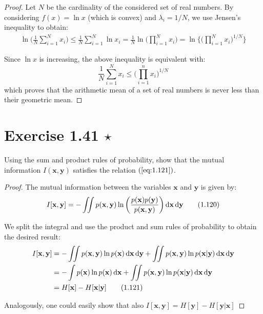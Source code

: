\begin{proof}
    Let $N$ be the cardinality of the considered set of real numbers. By considering
    $f(x) = \ln x$ (which is convex) and  $\lambda_i = 1/N$, we use Jensen's inequality
    to obtain:
    \begin{align*}
        \ln \bigg(\frac{1}{N} \sum_{i=1}^{N} x_i\bigg) 
        \leq \frac{1}{N} \sum_{i=1}^{N} \ln x_i
        = \frac{1}{N} \ln \bigg(\prod_{i = 1}^N x_i\bigg)
        = \ln \bigg\{\bigg(\prod_{i = 1}^N x_i\bigg)^{1/N}\bigg\}
    \end{align*}

    Since $\ln x$ is increasing, the above inequality is equivalent with:
     \[
         \frac{1}{N} \sum_{i=1}^{N} x_i \leq \bigg({\prod_{i = 1}^n x_i}\bigg)^{1/N}
    \] 
    which proves that the arithmetic mean of a set of real numbers 
    is never less than their geometric mean.
\end{proof}

\section*{Exercise 1.41 $\star$}
Using the sum and product rules of probability, show that the mutual
information $I(\mathbf{x}, \mathbf{y})$ satisfies the relation  $(\ref{eq:1.121})$.

\vspace{1em}

\begin{proof}
    The mutual information between the variables $\mathbf{x}$ and $\mathbf{y}$ is
    given by:
    \begin{equation*}
        I[\mathbf{x}, \mathbf{y}] 
        = -\iint p(\mathbf{x}, \mathbf{y}) \ln \bigg(\frac{p(\mathbf{x})p(\mathbf{y})}
        {p(\mathbf{x}, \mathbf{y})}\bigg) \mathop{}\!\mathrm{d} \mathbf{x} \mathop{}\!\mathrm{d} \mathbf{y}
        \tag{1.120}\label{eq:1.120}
    \end{equation*}

    We split the integral and use the product and sum rules of probability to obtain
    the desired result:
    \begin{align*}
        I[\mathbf{x}, \mathbf{y}] 
        &= -\iint p(\mathbf{x}, \mathbf{y}) \ln p(\mathbf{x}) \mathop{}\!\mathrm{d} \mathbf{x} \mathop{}\!\mathrm{d} \mathbf{y}
        + \iint p(\mathbf{x}, \mathbf{y}) \ln p(\mathbf{x} | \mathbf{y}) \mathop{}\!\mathrm{d} \mathbf{x} \mathop{}\!\mathrm{d} \mathbf{y} \\
        &= -\int p(\mathbf{x}) \ln p(\mathbf{x}) \mathop{}\!\mathrm{d} \mathbf{x} 
        + \iint p(\mathbf{x}, \mathbf{y}) \ln p(\mathbf{x} | \mathbf{y}) \mathop{}\!\mathrm{d} \mathbf{x} \mathop{}\!\mathrm{d} \mathbf{y} \\
        &= H[\mathbf{x}] - H[\mathbf{x} | \mathbf{y}] \tag{1.121}\label{eq:1.121}
    \end{align*}

    Analogously, one could easily show that also
    $I[\mathbf{x}, \mathbf{y}] = H[\mathbf{y}] - H[\mathbf{y} | \mathbf{x}]$
\end{proof}
